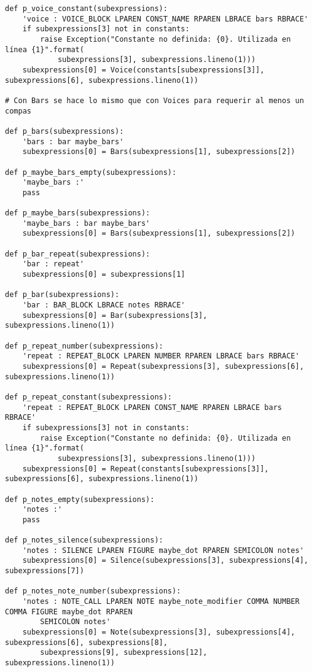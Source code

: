 \begin{verbatim}
def p_voice_constant(subexpressions):
    'voice : VOICE_BLOCK LPAREN CONST_NAME RPAREN LBRACE bars RBRACE'
    if subexpressions[3] not in constants:
        raise Exception("Constante no definida: {0}. Utilizada en línea {1}".format(
            subexpressions[3], subexpressions.lineno(1)))
    subexpressions[0] = Voice(constants[subexpressions[3]], subexpressions[6], subexpressions.lineno(1))

# Con Bars se hace lo mismo que con Voices para requerir al menos un compas

def p_bars(subexpressions):
    'bars : bar maybe_bars'
    subexpressions[0] = Bars(subexpressions[1], subexpressions[2])

def p_maybe_bars_empty(subexpressions):
    'maybe_bars :'
    pass

def p_maybe_bars(subexpressions):
    'maybe_bars : bar maybe_bars'
    subexpressions[0] = Bars(subexpressions[1], subexpressions[2])

def p_bar_repeat(subexpressions):
    'bar : repeat'
    subexpressions[0] = subexpressions[1]

def p_bar(subexpressions):
    'bar : BAR_BLOCK LBRACE notes RBRACE'
    subexpressions[0] = Bar(subexpressions[3], subexpressions.lineno(1))

def p_repeat_number(subexpressions):
    'repeat : REPEAT_BLOCK LPAREN NUMBER RPAREN LBRACE bars RBRACE'
    subexpressions[0] = Repeat(subexpressions[3], subexpressions[6], subexpressions.lineno(1))

def p_repeat_constant(subexpressions):
    'repeat : REPEAT_BLOCK LPAREN CONST_NAME RPAREN LBRACE bars RBRACE'
    if subexpressions[3] not in constants:
        raise Exception("Constante no definida: {0}. Utilizada en línea {1}".format(
            subexpressions[3], subexpressions.lineno(1)))
    subexpressions[0] = Repeat(constants[subexpressions[3]], subexpressions[6], subexpressions.lineno(1))

def p_notes_empty(subexpressions):
    'notes :'
    pass

def p_notes_silence(subexpressions):
    'notes : SILENCE LPAREN FIGURE maybe_dot RPAREN SEMICOLON notes'
    subexpressions[0] = Silence(subexpressions[3], subexpressions[4], subexpressions[7])

def p_notes_note_number(subexpressions):
    'notes : NOTE_CALL LPAREN NOTE maybe_note_modifier COMMA NUMBER COMMA FIGURE maybe_dot RPAREN
        SEMICOLON notes'
    subexpressions[0] = Note(subexpressions[3], subexpressions[4], subexpressions[6], subexpressions[8],
        subexpressions[9], subexpressions[12], subexpressions.lineno(1))


\end{verbatim}
